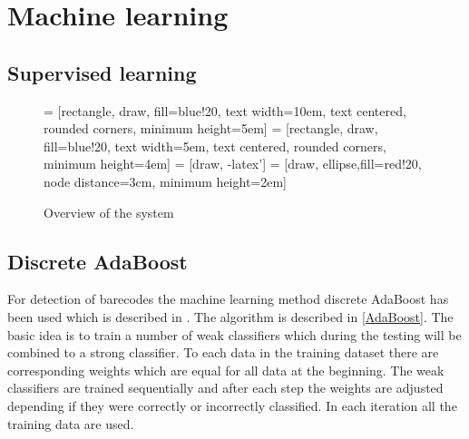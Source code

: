 \chapter{Machine learning}
\label{sec:Machine learning}

\section{Supervised learning}
\label{Supervised learning}

\begin{figure}[H]
\centering
{} = [rectangle, draw, fill=blue!20, 
    text width=10em, text centered, rounded corners, minimum height=5em]
 = [rectangle, draw, fill=blue!20, 
    text width=5em, text centered, rounded corners, minimum height=4em]
 = [draw, -latex']
 = [draw, ellipse,fill=red!20, node distance=3cm,
    minimum height=2em]
    
\caption{Overview of the system}
\label{system}
\end{figure}


\section{Discrete AdaBoost}
\label{sec:Discret AdaBoost}
For detection of barecodes the machine learning method discrete AdaBoost has been used which is described in \citep{Friedman:2000}. The algorithm is described in \ref{AdaBoost}. The basic idea is to train a number of weak classifiers which during the testing will be combined to a strong classifier. To each data in the training dataset there are corresponding weights which are equal for all data at the beginning. The weak classifiers are trained sequentially and after each step the weights are adjusted depending if they were correctly or incorrectly classified. In each iteration all the training data are used.

